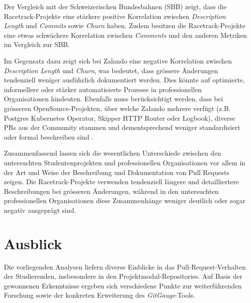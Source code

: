 Der Vergleich mit der Schweizerischen Bundesbahnen (SBB) zeigt, dass die Racetrack-Projekte eine stärkere positive Korrelation zwischen \textit{Description Length} und \textit{Commits} sowie \textit{Churn} haben. Zudem besitzen die Racetrack-Projekte eine etwas schwächere Korrelation zwischen \textit{Comments} und den anderen Metriken im Vergleich zur SBB.

Im Gegensatz dazu zeigt sich bei Zalando eine negative Korrelation zwischen \textit{Description Length} und \textit{Churn}, was bedeutet, dass grössere Änderungen tendenziell weniger ausführlich dokumentiert werden. Dies könnte auf optimierte, informellere oder stärker automatisierte Prozesse in professionellen Organisationen hindeuten. Ebenfalls muss berücksichtigt werden, dass bei grösseren OpenSource-Projekten, über welche Zalando mehrere verfügt (z.B. Postgres Kubernetes Operator, Skipper HTTP Router oder Logbook), diverse PRs aus der Community stammen und dementsprechend weniger standardisiert oder formal beschreiben sind \parencite{noauthor_zalandologbook_2025} \parencite{noauthor_zalandoskipper_2025} \parencite{noauthor_zalandopostgres-operator_2025}.

Zusammenfassend lassen sich die wesentlichen Unterschiede zwischen den untersuchten Studentenprojekten und professionellen Organisationen vor allem in der Art und Weise der Beschreibung und Dokumentation von Pull Requests zeigen. Die Racetrack-Projekte verwenden tendenziell längere und detailliertere Beschreibungen bei grösseren Änderungen, während in den untersuchten professionellen Organisationen diese Zusammenhänge weniger deutlich oder sogar negativ ausgeprägt sind.


\pagebreak
\section{Ausblick}
Die vorliegenden Analysen liefern diverse Einblicke in das Pull-Request-Verhalten der Studierenden, insbesondere in den Projektmodul-Repositories. 
Auf Basis der gewonnenen Erkenntnisse ergeben sich verschiedene Punkte zur weiterführenden Forschung sowie der konkreten Erweiterung des \textit{GitGauge}-Tools. 

